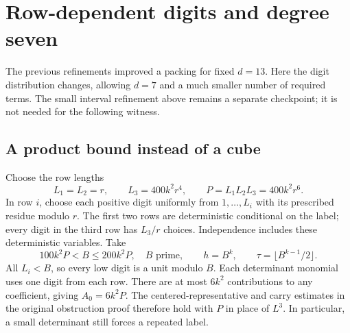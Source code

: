 \documentclass[11pt]{article}
\begin{document}
\section{Row-dependent digits and degree seven}\label{sec:rowdigits}
The previous refinements improved a packing for fixed $d=13$.
Here the digit distribution changes, allowing $d=7$ and a much smaller
number of required terms. The small interval refinement above remains a
separate checkpoint; it is not needed for the following witness.

\subsection{A product bound instead of a cube}
Choose the row lengths
\[
 L_1=L_2=r,\qquad L_3=400k^2r^4,\qquad
 P=L_1L_2L_3=400k^2r^6.
\]
In row $i$, choose each positive digit uniformly from $1,\ldots,L_i$
with its prescribed residue modulo $r$. The first two rows are
deterministic conditional on the label; every digit in the third row has
$L_3/r$ choices. Independence includes these deterministic variables.
Take
\[
 100k^2P<B\le200k^2P,\quad B\text{ prime},\qquad
 h=B^k,\qquad \tau=\lfloor B^{k-1}/2\rfloor.
\]
All $L_i<B$, so every low digit is a unit modulo $B$.
Each determinant monomial uses one digit from each row. There are at
most $6k^2$ contributions to any coefficient, giving
$A_0=6k^2P$. The centered-representative and carry estimates in the
original obstruction proof therefore hold with $P$ in place of $L^3$.
In particular, a small determinant still forces a repeated label.
\end{document}
